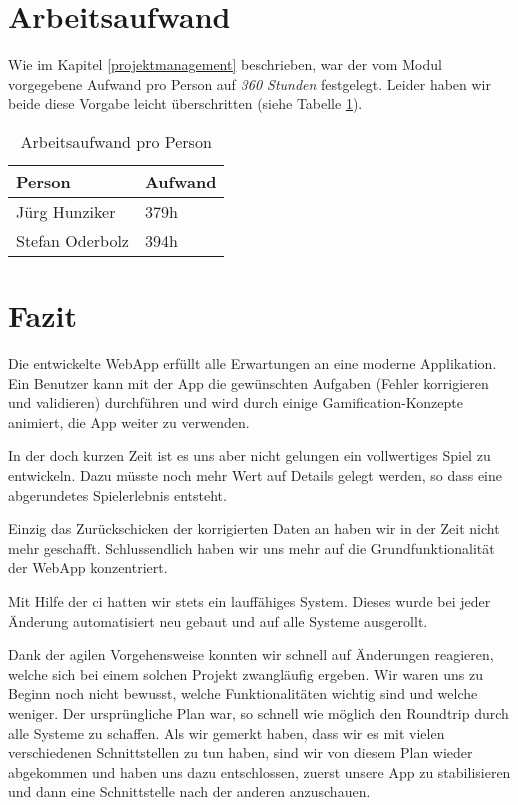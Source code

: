 \section{Arbeitsaufwand}
Wie im Kapitel \ref{projektmanagement} beschrieben, war der vom Modul vorgegebene Aufwand pro Person auf \emph{360 Stunden} festgelegt. Leider haben wir beide diese Vorgabe leicht überschritten (siehe Tabelle \ref{projektmanagement-arbeitsaufwand}).

\begin{table}[H]
\centering
\begin{tabular}{|l|l|}
\hline 
\textbf{Person} & \textbf{Aufwand} \\ 
\hline 
Jürg Hunziker & 379h \\
\hline 
Stefan Oderbolz & 394h \\  
\hline 
\end{tabular}
\caption{Arbeitsaufwand pro Person}
\label{projektmanagement-arbeitsaufwand}
\end{table} 

\section{Fazit}
\label{fazit}
Die entwickelte \gls{WebApp} erfüllt alle Erwartungen an eine moderne Applikation.
Ein Benutzer kann mit der App die gewünschten Aufgaben (Fehler korrigieren und validieren) durchführen und wird durch einige Gamification-Konzepte animiert, die App weiter zu verwenden.

In der doch kurzen Zeit ist es uns aber nicht gelungen ein vollwertiges Spiel zu entwickeln.
Dazu müsste noch mehr Wert auf Details gelegt werden, so dass eine abgerundetes Spielerlebnis entsteht.

Einzig das Zurückschicken der korrigierten Daten an  haben wir in der Zeit nicht mehr geschafft.
Schlussendlich haben wir uns mehr auf die Grundfunktionalität der \gls{WebApp} konzentriert.

Mit Hilfe der \gls{ci} hatten wir stets ein lauffähiges System.
Dieses wurde bei jeder Änderung automatisiert neu gebaut und auf alle Systeme ausgerollt.

Dank der agilen Vorgehensweise konnten wir schnell auf Änderungen reagieren, welche sich bei einem solchen Projekt zwangläufig ergeben.
Wir waren uns zu Beginn noch nicht bewusst, welche Funktionalitäten wichtig sind und welche weniger.
Der ursprüngliche Plan war, so schnell wie möglich den Roundtrip durch alle Systeme zu schaffen.
Als wir gemerkt haben, dass wir es mit vielen verschiedenen Schnittstellen zu tun haben, sind wir von diesem Plan wieder abgekommen und haben uns dazu entschlossen, zuerst unsere App zu stabilisieren und dann eine Schnittstelle nach der anderen anzuschauen.

